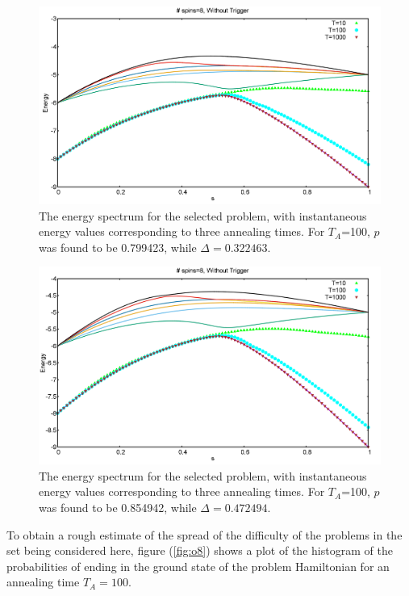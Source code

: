 \documentclass[12]{article}
\begin{document}
\begin{figure}[H]
\centering 
\includegraphics[scale=0.3]{79_s8_O.png}
\caption{The energy spectrum for the selected problem, with instantaneous energy values corresponding to three annealing times. For $T_A$=100, $p$ was found to be 0.799423, while $\Delta=0.322463.$}
\label{fig:o6}
\end{figure}
\begin{figure}[H]
\centering 
\includegraphics[scale=0.3]{59_s8_O.png}
\caption{The energy spectrum for the selected problem, with instantaneous energy values corresponding to three annealing times. For $T_A$=100, $p$ was found to be 0.854942, while $\Delta=0.472494.$}
\label{fig:o7}
\end{figure}
\newpage
To obtain a rough estimate of the spread of the difficulty of the problems in the set being considered here, figure (\ref{fig:o8}) shows a plot of the histogram of the probabilities of ending in the ground state of the problem Hamiltonian for an annealing time $T_A=100$. 
\end{document}

